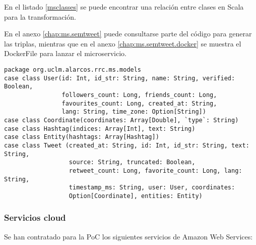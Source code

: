 En el listado \ref{msclasses} se puede encontrar una relación entre clases en
Scala para la transformación. 

En el anexo \ref{chap:ms.semtweet} puede consultarse parte del código para
generar las triplas, mientras que en el anexo \ref{chap:ms.semtweet.docker} se muestra el DockerFile para lanzar el
microservicio. 

\lstset{escapechar=@,language=scala}
\begin{lstlisting}[caption={Entidades de transformación en Scala},captionpos=b, label=msclasses]
package org.uclm.alarcos.rrc.ms.models
case class User(id: Int, id_str: String, name: String, verified: Boolean,
                followers_count: Long, friends_count: Long,
                favourites_count: Long, created_at: String,                
                lang: String, time_zone: Option[String])
case class Coordinate(coordinates: Array[Double], `type`: String)
case class Hashtag(indices: Array[Int], text: String)
case class Entity(hashtags: Array[Hashtag])
case class Tweet (created_at: String, id: Int, id_str: String, text: String,
                  source: String, truncated: Boolean,
                  retweet_count: Long, favorite_count: Long, lang: String,
                  timestamp_ms: String, user: User, coordinates:
                  Option[Coordinate], entities: Entity)
\end{lstlisting}


\subsubsection{Servicios cloud}
\label{res:cloud}
Se han contratado para la \acs{PoC} los siguientes servicios de Amazon Web
Services: 

